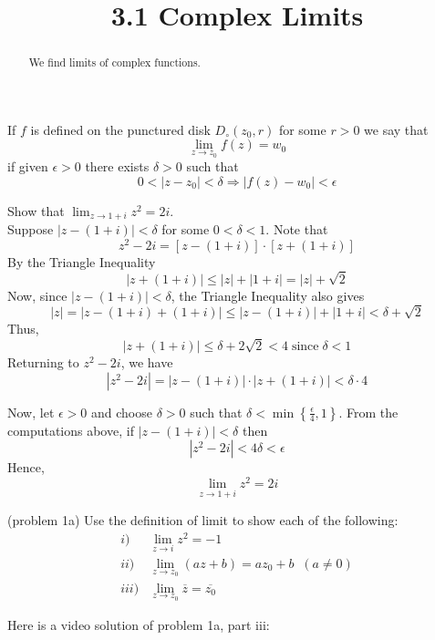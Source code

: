 \documentclass[handout]{ximera}
\title{3.1 Complex Limits}
\begin{document}
\begin{abstract}
We find limits of complex functions.
\end{abstract}

\maketitle


\begin{definition} If $f$ is defined on the punctured disk $D_\circ(z_0, r)$ for some $r>0$ we say that
\[
\lim_{z \to z_0} f(z) = w_0
\]
if given $\epsilon > 0$ there exists $\delta >0$ such that 
\[
0< |z-z_0| < \delta \Rightarrow |f(z) - w_0| < \epsilon
\]
\end{definition}
 

\begin{example}[example 1]
Show that $\displaystyle \lim_{z \to 1+i} z^2 = 2i$.\\[6pt]
Suppose $|z-(1+i)| < \delta$ \; for some $0< \delta < 1$.
Note that
\[
z ^2 - 2i=\left[z-(1+i)\right] \cdot \left[z + (1+i)\right]
\]
By the Triangle Inequality
\[
|z+(1+i)| \leq |z| + |1+i| = |z| + \sqrt 2
\]
Now, since $|z-(1+i)| < \delta$, \; the Triangle Inequality also gives
\[
|z| = |z-(1+i) +(1+i)| \leq |z-(1+i)| + |1+i| < \delta + \sqrt 2 
\]
Thus,
\[
|z+(1+i)| \leq \delta + 2\sqrt 2 <  4 \; \mbox{since} \; \delta < 1
\]
Returning to $z^2 - 2i$, we have
\[
|z ^2 - 2i| = |z-(1+i)| \cdot | z+(1+i)| < \delta \cdot 4
\]

Now, let $\epsilon > 0$ and choose $\delta> 0$ such that $\delta < \min\left\{\frac{\epsilon}{4}, 1\right\}$. 
From the computations above, if $|z-(1+i)| < \delta$ then
\[
|z^2 - 2i| < 4\delta < \epsilon
\]
Hence,
\[
\lim_{z \to 1+i} z^2 = 2i
\]


\end{example}

\begin{problem}(problem 1a) Use the definition of limit to show each of the following:
\begin{align*}
i) & \displaystyle \lim_{z \to i} z^2 = -1\\
ii) & \displaystyle \lim_{z \to z_0} (az+b) = az_0 + b \;\;(a \neq 0)\\
iii) & \displaystyle \lim_{z \to z_0} \overline{z} = \overline{z_0}
\end{align*}
\end{problem}

Here is a video solution of problem 1a, part iii:\\
\begin{foldable}
\end{foldable}
\end{document}
